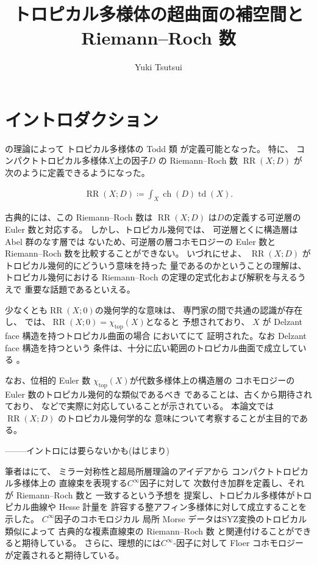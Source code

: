 \documentclass[a4paper,dvipdfmx,reqno,12pt]{amsart}
\title{トロピカル多様体の超曲面の補空間と Riemann--Roch 数}
\author[Y. Tsutsui]{Yuki Tsutsui}
\theoremstyle{definition}
\newcommand{\deq}{\coloneqq}
\newcommand{\opn}[1]{\operatorname{#1}}
\numberwithin{equation}{section}
\begin{document}
\maketitle

\section{イントロダクション}

\cite{demedrano2023chern}の理論によって
トロピカル多様体の Todd 類 が定義可能となった。
特に、
コンパクトトロピカル多様体$X$上の因子$D$ の
Riemann--Roch 数 $\opn{RR}(X;D)$ が
次のように定義できるようになった。

\begin{align}
     \opn{RR}(X;D)\deq \int_{X}\opn{ch}(D)\opn{td}(X).
\end{align}

古典的には、この Riemann--Roch 数は $\opn{RR}(X;D)$
は$D$の定義する可逆層の Euler 数と対応する。
しかし、トロピカル幾何では、
可逆層とくに構造層は Abel 群のなす層では
ないため、可逆層の層コホモロジーの Euler 数と
Riemann--Roch 数を比較することができない。
いづれにせよ、
$\opn{RR}(X;D)$ がトロピカル幾何的にどういう意味を持った
量であるのかということの理解は、
トロピカル幾何における
Riemann--Roch の定理の定式化および解釈を与えるうえで
重要な話題であるといえる。

少なくとも$\opn{RR}(X;0)$の幾何学的な意味は、
専門家の間で共通の認識が存在し、
\cite[Conjecture 6.13]{demedrano2023chern}
では、$\opn{RR}(X;0)=\chi_{\opn{top}}(X)$となると
予想されており、
$X$ が Delzant face 構造を持つトロピカル曲面の場合
において\cite[Theorem 6.3]{demedrano2023chern}にて
証明された。なお Delzant face 構造を持つという
条件は、十分に広い範囲のトロピカル曲面で成立している
\cite[Corollary 6.11]{demedrano2023chern}。

なお、位相的 Euler 数
$\chi_{\opn{top}}(X)$が代数多様体上の構造層の
コホモロジーの Euler 数のトロピカル幾何的な類似であるべき
であることは、古くから期待されており、
\cite[Corollary 2]{MR3961331}
などで実際に対応していることが示されている。
本論文では $\opn{RR}(X;D)$ のトロピカル幾何学的な
意味について考察することが主目的である。

--------イントロには要らないかも(はじまり)

筆者は\cite{tsutsui2023graded}にて、
ミラー対称性と超局所層理論のアイデアから
コンパクトトロピカル多様体上の
直線束を表現する$C^{\infty}$因子に対して
次数付き加群を定義し、それが Riemann--Roch 数と
一致するという予想\cite[Conjecture 1.2]{tsutsui2023graded}を
提案し、トロピカル多様体がトロピカル曲線や Hesse 計量を
許容する整アフィン多様体に対して成立することを示した。
$C^{\infty}$因子のコホモロジカル
局所 Morse データはSYZ変換のトロピカル類似によって
古典的な複素直線束の Riemann--Roch 数
と関連付けることができると期待している。
さらに、理想的には$C^{\infty}$-因子に対して
Floer コホモロジーが定義されると期待している。
\end{document}
